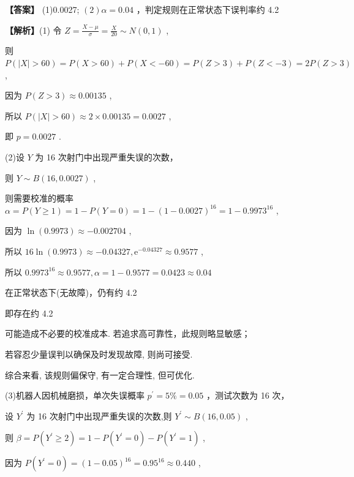 \documentclass[10pt]{article}
\begin{document}
\textbf{【答案】} (1)0.0027; \(\left( 2\right) \alpha  = {0.04}\) ，判定规则在正常状态下误判率约 4.2%

\textbf{【解析】}(1) 令 \(Z = \frac{X - \mu }{\sigma } = \frac{X}{20} \sim  N\left( {0,1}\right)\) ,

则 \(P\left( {\left| X\right|  > {60}}\right)  = P\left( {X > {60}}\right)  + P\left( {X <  - {60}}\right)  = P\left( {Z > 3}\right)  + P\left( {Z <  - 3}\right)  = {2P}\left( {Z > 3}\right)\) ,

因为 \(P\left( {Z > 3}\right)  \approx  {0.00135}\) ,

所以 \(P\left( {\left| X\right|  > {60}}\right)  \approx  2 \times  {0.00135} = {0.0027}\) ,

即 \(p = {0.0027}\) .

(2)设 \(Y\) 为 16 次射门中出现严重失误的次数，

则 \(Y \sim  B\left( {{16},{0.0027}}\right)\) ,

则需要校准的概率 \(\alpha  = P\left( {Y \geq  1}\right)  = 1 - P\left( {Y = 0}\right)  = 1 - {\left( 1 - {0.0027}\right) }^{16} = 1 - {0.9973}^{16}\) ,

因为 \(\ln \left( {0.9973}\right)  \approx   - {0.002704}\) ,

所以 \({16}\ln \left( {0.9973}\right)  \approx   - {0.04327},{\mathrm{e}}^{-{0.04327}} \approx  {0.9577}\) ,

所以 \({0.9973}^{16} \approx  {0.9577},\alpha  = 1 - {0.9577} = {0.0423} \approx  {0.04}\)

在正常状态下(无故障)，仍有约 4.2%

即存在约 4.2%

可能造成不必要的校准成本. 若追求高可靠性，此规则略显敏感；

若容忍少量误判以确保及时发现故障, 则尚可接受.

综合来看, 该规则偏保守, 有一定合理性, 但可优化.

(3)机器人因机械磨损，单次失误概率 \({p}^{\prime } = 5\%  = {0.05}\) ，测试次数为 16 次，

设 \({Y}^{\prime }\) 为 16 次射门中出现严重失误的次数,则 \({Y}^{\prime } \sim  B\left( {{16},{0.05}}\right)\) ,

则 \(\beta  = P\left( {{Y}^{\prime } \geq  2}\right)  = 1 - P\left( {{Y}^{\prime } = 0}\right)  - P\left( {{Y}^{\prime } = 1}\right)\) ,

因为 \(P\left( {{Y}^{\prime } = 0}\right)  = {\left( 1 - {0.05}\right) }^{16} = {0.95}^{16} \approx  {0.440}\) ,
\end{document}
